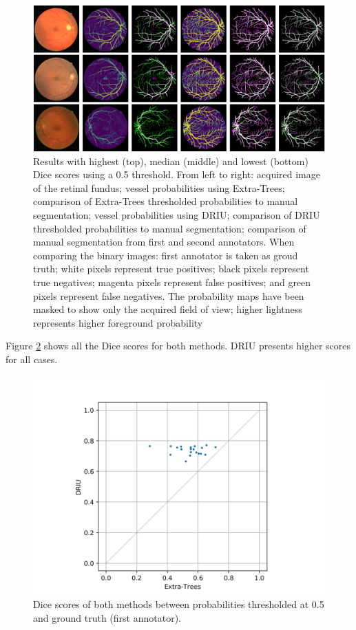 \begin{figure}
  \includegraphics[width=\textwidth]{figures/collage}
  \caption{Results with highest (top), median (middle) and lowest (bottom) Dice scores using a 0.5 threshold. From left to right: acquired image of the retinal fundus; vessel probabilities using Extra-Trees; comparison of Extra-Trees thresholded probabilities to manual segmentation; vessel probabilities using DRIU; comparison of DRIU thresholded probabilities to manual segmentation; comparison of manual segmentation from first and second annotators. When comparing the binary images: first annotator is taken as groud truth; white pixels represent true positives; black pixels represent true negatives; magenta pixels represent false positives; and green pixels represent false negatives. The probability maps have been masked to show only the acquired field of view; higher lightness represents higher foreground probability} \label{fig:collage}
\end{figure}

Figure \ref{fig:dice} shows all the Dice scores for both methods. DRIU presents higher scores for all cases.

\begin{figure}
  \includegraphics[width=\textwidth]{figures/dices}
  \caption{Dice scores of both methods between probabilities thresholded at 0.5 and ground truth (first annotator).} \label{fig:dice}
\end{figure}

